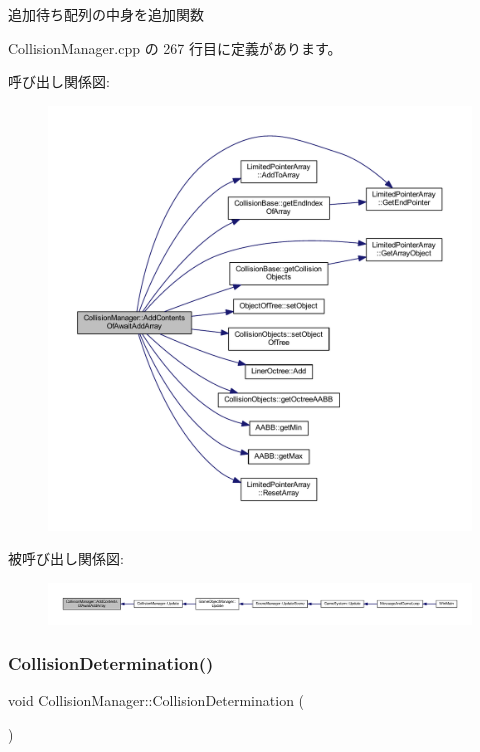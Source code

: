 追加待ち配列の中身を追加関数 



 Collision\+Manager.\+cpp の 267 行目に定義があります。

呼び出し関係図\+:\nopagebreak
\begin{figure}[H]
\begin{center}
\leavevmode
\includegraphics[width=350pt]{class_collision_manager_a53e468bb8624f84a5c65c9779781033f_cgraph}
\end{center}
\end{figure}
被呼び出し関係図\+:
\nopagebreak
\begin{figure}[H]
\begin{center}
\leavevmode
\includegraphics[width=350pt]{class_collision_manager_a53e468bb8624f84a5c65c9779781033f_icgraph}
\end{center}
\end{figure}
\mbox{\label{class_collision_manager_a67c1ebc4d4a19e06122f11c3eeec89ec}} 
\subsubsection{\texorpdfstring{Collision\+Determination()}{CollisionDetermination()}}
{\footnotesize\ttfamily void Collision\+Manager\+::\+Collision\+Determination (\begin{DoxyParamCaption}{ }\end{DoxyParamCaption})\hspace{0.3cm}{\ttfamily [private]}}



